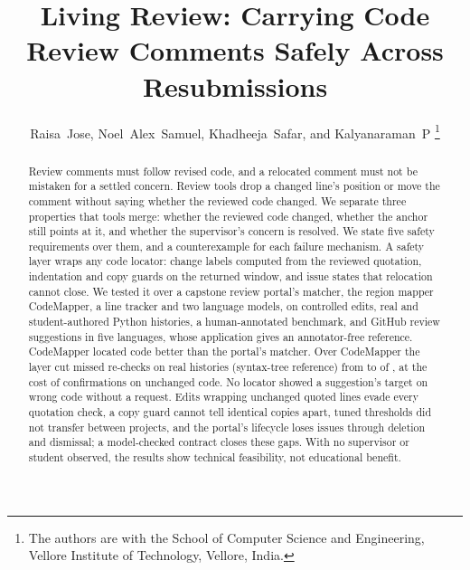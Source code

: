 \newcommand{\vTwelveAbstract}{%
Review comments must follow revised code, and a relocated comment must not be mistaken for a settled concern. Review tools drop a changed line's position or move the comment without saying whether the reviewed code changed. We separate three properties that tools merge: whether the reviewed code changed, whether the anchor still points at it, and whether the supervisor's concern is resolved. We state five safety requirements over them, and a counterexample for each failure mechanism. A safety layer wraps any code locator: change labels computed from the reviewed quotation, indentation and copy guards on the returned window, and issue states that relocation cannot close. We tested it over a capstone review portal's matcher, the region mapper CodeMapper, a line tracker and two language models, on controlled edits, real and student-authored Python histories, a human-annotated benchmark, and \wkUnits{} GitHub review suggestions in five languages, whose application gives an annotator-free reference. CodeMapper located code better than the portal's matcher. Over CodeMapper the layer cut missed re-checks on real histories (syntax-tree reference) from \wiRealCmQMissK{} to \wiRealCmGiMissK{} of \wiRealCmQMissN{}, at the cost of confirmations on unchanged code. No locator showed a suggestion's target on wrong code without a request. Edits wrapping unchanged quoted lines evade every quotation check, a copy guard cannot tell identical copies apart, tuned thresholds did not transfer between projects, and the portal's lifecycle loses issues through deletion and dismissal; a model-checked contract closes these gaps. With no supervisor or student observed, the results show technical feasibility, not educational benefit.}



\title{Living Review: Carrying Code Review Comments Safely Across Resubmissions}
\author{Raisa~Jose, Noel~Alex~Samuel, Khadheeja~Safar, and Kalyanaraman~P%
\thanks{The authors are with the School of Computer Science and Engineering, Vellore Institute of Technology, Vellore, India.}}

\maketitle

\begin{abstract}
\vTwelveAbstract
\end{abstract}

